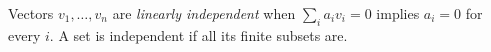 
Vectors $v_1,\ldots,v_n$ are \emph{linearly independent} when $\sum_i a_iv_i=0$ implies $a_i=0$ for every $i$. A set is independent if all its finite subsets are.
